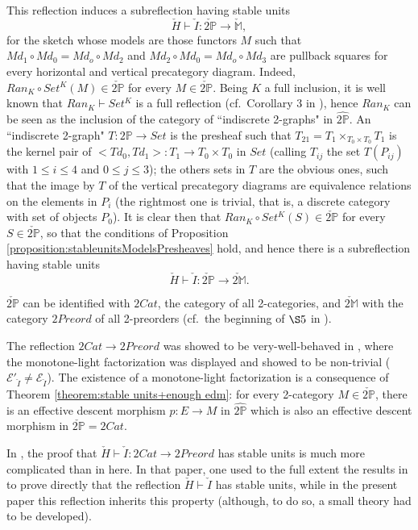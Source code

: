 \documentclass[12pt,a4paper]{amsart}
\theoremstyle{definition}
\begin{document}
This reflection induces a subreflection having stable units $$\check{H}\vdash \check{I}:\check{2\mathbb{P}}\rightarrow \check{\mathbb{M}},$$ for the sketch whose models are those functors $M$ such that $Md_1\circ Md_0=Md_o\circ Md_2$ and $Md_2\circ Md_0=Md_o\circ Md_3$ are pullback squares for every horizontal and vertical precategory diagram. Indeed, $Ran_K\circ Set^K(M)\in \check{2\mathbb{P}}$ for every $M\in \check{2\mathbb{P}}$. Being $K$ a full inclusion, it is well known that $Ran_K\vdash Set^K$ is a full reflection (cf.\ Corollary 3 in \cite[\S X.3]{SM:cat}), hence $Ran_K$ can be seen as the inclusion of the category of ``indiscrete 2-graphs" in $\hat{2\mathbb{P}}$. An ``indiscrete 2-graph" $T:2\mathbb{P}\rightarrow Set$ is the presheaf such that $T_{21}=T_1\times_{T_0\times T_0}T_1$ is the kernel pair of $<Td_0,Td_1>:T_1\rightarrow T_0\times T_0$ in $Set$ (calling $T_{ij}$ the set $T(P_{ij})$ with $1\leq i\leq 4$ and $0\leq j\leq 3$); the others sets in $T$ are the obvious ones, such that the image by $T$ of the vertical precategory diagrams are equivalence relations on the elements in $P_i$ (the rightmost one is trivial, that is, a discrete category with set of objects $P_0$). It is clear then that $Ran_K\circ Set^K(S)\in \check{2\mathbb{P}}$ for every $S\in \check{2\mathbb{P}}$, so that the conditions of Proposition \ref{proposition:stableunitsModelsPresheaves} hold, and hence there is a subreflection having stable units $$\check{H}\vdash \check{I}: \check{2\mathbb{P}}\rightarrow \check{2\mathbb{M}}.$$

$\check{2\mathbb{P}}$ can be identified with $2Cat$, the category of all 2-categories, and $\check{2\mathbb{M}}$ with the category $2Preord$ of all 2-preorders (cf.\ the beginning of $\S 5$ in \cite{X:2ml}).

The reflection $2Cat\rightarrow 2Preord$ was showed to be very-well-behaved in \cite{X:2ml}, where the monotone-light factorization was displayed and showed to be non-trivial ($\mathcal{E}'_{\check{I}}\neq\mathcal{E}_{\check{I}}$). The existence of a monotone-light factorization is a consequence of Theorem \ref{theorem:stable units+enough edm}: for every 2-category $M\in\check{2\mathbb{P}}$, there is an effective descent morphism $p:E\rightarrow M$ in $\hat{2\mathbb{P}}$ which is also an effective descent morphism in $\check{2\mathbb{P}}=2Cat$.

In \cite{X:2ml}, the proof that $\check{H}\vdash\check{I}:2Cat\rightarrow 2Preord$ has stable units is much more complicated than in here. In that paper, one used to the full extent the results in \cite{X:GenConComp} to prove directly that the reflection $\check{H}\vdash\check{I}$ has stable units, while in the present paper this reflection inherits this property (although, to do so, a small theory had to be developed).
\end{document}
